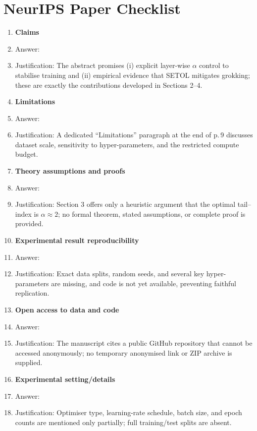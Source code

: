 \section*{NeurIPS Paper Checklist}

\begin{enumerate}

\item {\bf Claims}  
    \item[] Answer: \answerYes{}  
    \item[] Justification: The abstract promises (i) explicit layer-wise $\alpha$ control to stabilise training and (ii) empirical evidence that SETOL mitigates grokking; these are exactly the contributions developed in Sections 2–4.  

\item {\bf Limitations}  
    \item[] Answer: \answerYes{}  
    \item[] Justification: A dedicated “Limitations” paragraph at the end of p.\,9 discusses dataset scale, sensitivity to hyper-parameters, and the restricted compute budget.  

\item {\bf Theory assumptions and proofs}  
    \item[] Answer: \answerNo{}  
    \item[] Justification: Section 3 offers only a heuristic argument that the optimal tail–index is $\alpha\!\approx\!2$; no formal theorem, stated assumptions, or complete proof is provided.  

\item {\bf Experimental result reproducibility}  
    \item[] Answer: \answerNo{}  
    \item[] Justification: Exact data splits, random seeds, and several key hyper-parameters are missing, and code is not yet available, preventing faithful replication.  

\item {\bf Open access to data and code}  
    \item[] Answer: \answerNo{}  
    \item[] Justification: The manuscript cites a public GitHub repository that cannot be accessed anonymously; no temporary anonymised link or ZIP archive is supplied.  

\item {\bf Experimental setting/details}  
    \item[] Answer: \answerNo{}  
    \item[] Justification: Optimiser type, learning-rate schedule, batch size, and epoch counts are mentioned only partially; full training/test splits are absent.  


\end{enumerate}
